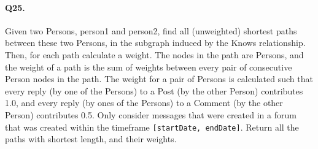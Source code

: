 \paragraph{Q25.}
Given two Persons, person1 and person2, find all (unweighted) shortest
paths between these two Persons, in the subgraph induced by the Knows
relationship.
Then, for each path calculate a weight. The nodes in the path are
Persons, and the weight of a path is the sum of weights between every
pair of consecutive Person nodes in the path.
The weight for a pair of Persons is calculated such that every reply (by
one of the Persons) to a Post (by the other Person) contributes 1.0, and
every reply (by ones of the Persons) to a Comment (by the other Person)
contributes 0.5.
Only consider messages that were created in a forum that was created
within the timeframe \texttt{{[}startDate,\ endDate{]}}.
Return all the paths with shortest length, and their weights.
